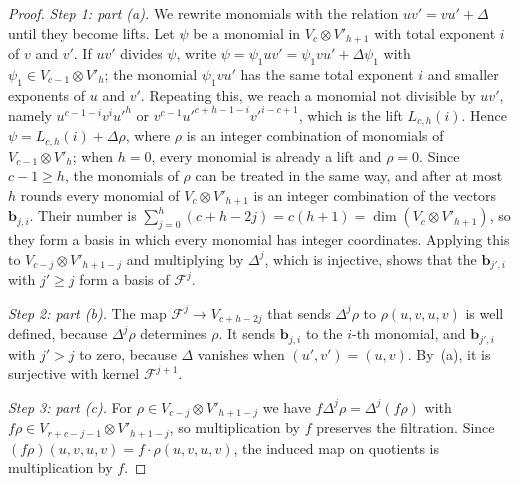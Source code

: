 \begin{proof}
\emph{Step 1: part (a).} We rewrite monomials with the relation
\(uv'=vu'+\Delta\) until they become lifts. Let \(\psi\) be a monomial in
\(V_c\otimes V'_{h+1}\) with total exponent \(i\) of \(v\) and \(v'\). If
\(uv'\) divides \(\psi\), write \(\psi=\psi_1uv'=\psi_1vu'+\Delta\psi_1\)
with \(\psi_1\in V_{c-1}\otimes V'_h\); the monomial \(\psi_1vu'\) has the
same total exponent \(i\) and smaller exponents of \(u\) and \(v'\).
Repeating this, we reach a monomial not divisible by \(uv'\), namely
\(u^{c-1-i}v^iu'^h\) or \(v^{c-1}u'^{c+h-1-i}v'^{i-c+1}\), which is the
lift \(L_{c,h}(i)\). Hence \(\psi=L_{c,h}(i)+\Delta\rho\), where \(\rho\) is
an integer combination of monomials of \(V_{c-1}\otimes V'_h\); when
\(h=0\), every monomial is already a lift and \(\rho=0\). Since
\(c-1\ge h\), the monomials of \(\rho\) can be treated in the same way, and
after at most \(h\) rounds every monomial of \(V_c\otimes V'_{h+1}\) is an
integer combination of the vectors \(\mathbf b_{j,i}\). Their number is
\(\sum_{j=0}^h(c+h-2j)=c(h+1)=\dim(V_c\otimes V'_{h+1})\), so they form a
basis in which every monomial has integer coordinates. Applying this to
\(V_{c-j}\otimes V'_{h+1-j}\) and multiplying by \(\Delta^j\), which is
injective, shows that the \(\mathbf b_{j',i}\) with \(j'\ge j\) form a
basis of \(\mathcal F^j\).

\emph{Step 2: part (b).} The map \(\mathcal F^j\to V_{c+h-2j}\) that sends
\(\Delta^j\rho\) to \(\rho(u,v,u,v)\) is well defined, because
\(\Delta^j\rho\) determines \(\rho\). It sends \(\mathbf b_{j,i}\) to
the \(i\)-th monomial, and \(\mathbf b_{j',i}\) with \(j'>j\) to zero,
because \(\Delta\) vanishes when \((u',v')=(u,v)\). By~(a), it is
surjective with kernel \(\mathcal F^{j+1}\).

\emph{Step 3: part (c).} For \(\rho\in V_{c-j}\otimes V'_{h+1-j}\) we have
\(f\Delta^j\rho=\Delta^j(f\rho)\) with
\(f\rho\in V_{r+c-j-1}\otimes V'_{h+1-j}\), so multiplication by \(f\)
preserves the filtration. Since
\((f\rho)(u,v,u,v)=f\cdot\rho(u,v,u,v)\), the induced map on quotients is
multiplication by \(f\).
\end{proof}

